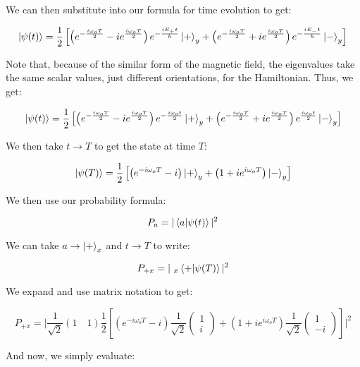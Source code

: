 \begin{enumerate}
\begin{enumerate}
        We can then substitute into our formula for time evolution to get:

        $$\ket{\psi(t)}=\frac{1}{2}\left[\left(e^{-\frac{i\omega_o T}{2}}-ie^{\frac{i\omega_o T}{2}}\right)e^{-\frac{iE_+t}{\hbar}}\ket{+}_y+\left(e^{-\frac{i\omega_o T}{2}}+ie^{\frac{i\omega_o T}{2}}\right)e^{-\frac{iE_-t}{\hbar}}\ket{-}_y\right]$$

        Note that, because of the similar form of the magnetic field, the eigenvalues take the same scalar values, just different orientations, for the Hamiltonian. Thus, we get:

        $$\ket{\psi(t)}=\frac{1}{2}\left[\left(e^{-\frac{i\omega_o T}{2}}-ie^{\frac{i\omega_o T}{2}}\right)e^{-\frac{i\omega_ot}{2}}\ket{+}_y+\left(e^{-\frac{i\omega_o T}{2}}+ie^{\frac{i\omega_o T}{2}}\right)e^{\frac{i\omega_ot}{2}}\ket{-}_y\right]$$

        We then take $t\to T$ to get the state at time $T$:

        $$\ket{\psi(T)}=\frac{1}{2}\left[\left(e^{-i\omega_o T}-i\right)\ket{+}_y+\left(1+ie^{i\omega_o T}\right)\ket{-}_y\right]$$

        We then use our probability formula:

        $$P_a=|\bra{a}\ket{\psi(t)}|^2$$

        We can take $a\to\ket{+}_x$ and $t\to T$ to write:

        $$P_{+x}=|\,\,_x\bra{+}\ket{\psi(T)}|^2$$

        We expand and use matrix notation to get:

        $$P_{+x}=\Big|\frac{1}{\sqrt{2}} (1\quad1 )\frac{1}{2}\left[\left(e^{-i\omega_o T}-i\right)\frac{1}{\sqrt{2}}\left( \begin{matrix}1\\i \end{matrix}\right)+\left(1+ie^{i\omega_o T}\right)\frac{1}{\sqrt{2}}\left( \begin{matrix} 1\\-i\end{matrix} \right)\right]\Big|^2$$

        And now, we simply evaluate:


\end{enumerate}
\end{enumerate}
